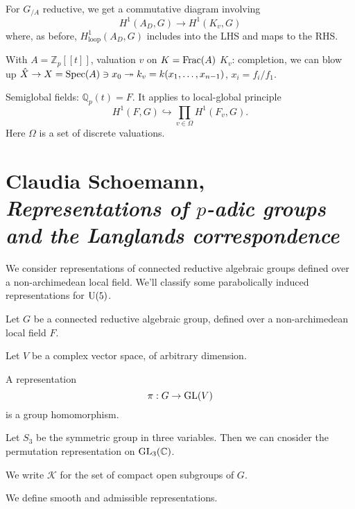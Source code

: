 \documentclass[reqno]{amsart} 
\numberwithin{theorem}{section}
\numberwithin{equation}{section}
\begin{document}
\begin{theorem}
  For $G_{/A}$ reductive, we get a commutative diagram involving
  \begin{equation*}
    H^1(A_D, G) \rightarrow H^1(K_v, G)
  \end{equation*}
  where, as before, $H^1_{\mathrm{loop}}(A_D, G)$ includes into the LHS and maps to the RHS.
\end{theorem}

With $A = \mathbb{Z}_p[[t]]$, valuation $v$ on $K = \operatorname{Frac}(A)$ $K_v$: completion, we can blow up $\hat{X} \rightarrow X = \operatorname{Spec}(A)\ni x_0 \twoheadrightarrow k_v = k(x_1, \dotsc, x_{n - 1})$, $x_i = f_i / f_1$.

Semiglobal fields: $\mathbb{Q}_p(t) = F$.  It applies to local-global principle
\begin{equation*}
  H^1(F, G) \hookrightarrow \prod_{v \in \Omega} H^1(F_v, G).
\end{equation*}
Here $\Omega$ is a set of discrete valuations.

\section{Claudia Schoemann, \emph{Representations of $p$-adic groups and the Langlands correspondence}}

We consider representations of connected reductive algebraic groups defined over a non-archimedean local field.  We'll classify some parabolically induced representations for $\operatorname{U}(5)$.

Let $G$ be a connected reductive algebraic group, defined over a non-archimedean local field $F$.

Let $V$ be a complex vector space, of arbitrary dimension.

\begin{definition}
  A representation
  \begin{equation*}
    \pi : G \rightarrow \operatorname{GL}(V)
  \end{equation*}
  is a group homomorphism.
\end{definition}

\begin{example}
  Let $S_3$ be the symmetric group in three variables.  Then we can cnosider the permutation representation on $\operatorname{GL}_3(\mathbb{C})$.
\end{example}

We write $\mathcal{K}$ for the set of compact open subgroups of $G$.

We define smooth and admissible representations.
\end{document}
